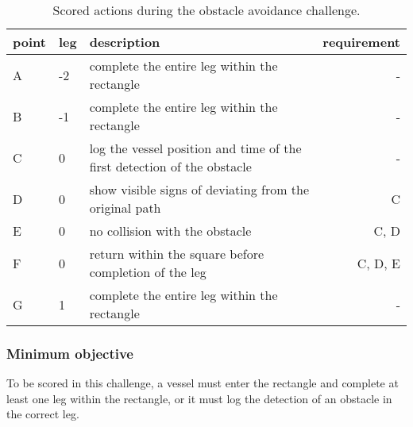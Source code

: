 \documentclass[12pt]{article}
\begin{document}
\begin{table}
\centering
\begin{tabular}{l|l|p{8cm}|r}
point & leg & description & requirement \\
\hline
\hline
A & -2 & complete the entire leg within the rectangle & - \\
\hline
B & -1 & complete the entire leg within the rectangle & - \\
\hline
C & 0  & log the vessel position and time of the first detection of the obstacle & - \\
\hline
D & 0 & show visible signs of deviating from the original path & C \\
\hline
E & 0 & no collision with the obstacle & C, D\\
\hline
F & 0 & return within the square before completion of the leg & C, D, E\\
\hline
G & 1 & complete the entire leg within the rectangle & - \\
\hline
\end{tabular}
\caption{Scored actions during the obstacle avoidance challenge.}
\label{tab:obstacleActions}
\end{table}


\subsubsection{Minimum objective}
To be scored in this challenge, a vessel must enter the rectangle and complete
at least one leg within the rectangle, or it must log the detection of an
obstacle in the correct leg.
\end{document}
